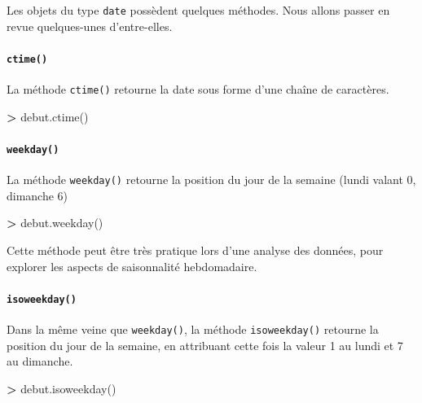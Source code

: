 \documentclass[12pt,]{book}
\newenvironment{Shaded}{\begin{snugshade}}{\end{snugshade}}
\newcommand{\OperatorTok}[1]{\textcolor[rgb]{0.81,0.36,0.00}{\textbf{#1}}}
\newcommand{\NormalTok}[1]{#1}
\let\oldparagraph\paragraph
\renewcommand{\paragraph}[1]{\oldparagraph{#1}\mbox{}}
\numberwithin{equation}{section}
\numberwithin{countremarque}{section}
\let\BeginKnitrBlock\begin \let\EndKnitrBlock\end
\begin{document}
Les objets du type \texttt{date} possèdent quelques méthodes. Nous
allons passer en revue quelques-unes d'entre-elles.

\paragraph{\texorpdfstring{\texttt{ctime()}}{ctime()}}\label{ctime}

La méthode \texttt{ctime()} retourne la date sous forme d'une chaîne de
caractères.

\begin{Shaded}
\begin{Highlighting}[]
\OperatorTok{>}\NormalTok{ debut.ctime()}
\end{Highlighting}
\end{Shaded}

\paragraph{\texorpdfstring{\texttt{weekday()}}{weekday()}}\label{weekday}

La méthode \texttt{weekday()} retourne la position du jour de la semaine
(lundi valant 0, dimanche 6)

\begin{Shaded}
\begin{Highlighting}[]
\OperatorTok{>}\NormalTok{ debut.weekday()}
\end{Highlighting}
\end{Shaded}

\BeginKnitrBlock{remarque}
Cette méthode peut être très pratique lors d'une analyse des données,
pour explorer les aspects de saisonnalité hebdomadaire.
\EndKnitrBlock{remarque}

\paragraph{\texorpdfstring{\texttt{isoweekday()}}{isoweekday()}}\label{isoweekday}

Dans la même veine que \texttt{weekday()}, la méthode
\texttt{isoweekday()} retourne la position du jour de la semaine, en
attribuant cette fois la valeur 1 au lundi et 7 au dimanche.

\begin{Shaded}
\begin{Highlighting}[]
\OperatorTok{>}\NormalTok{ debut.isoweekday()}
\end{Highlighting}
\end{Shaded}
\end{document}
